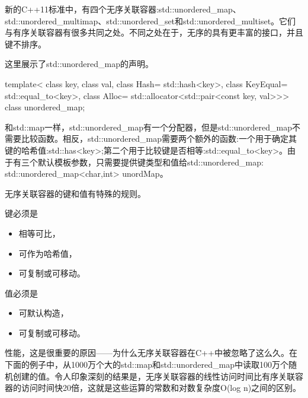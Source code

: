 





新的C++11标准中，有四个无序关联容器:std::unordered\_map、std::unordered\_multimap、std::unordered\_set和std::unordered\_multiset。它们与有序关联容器有很多共同之处。不同之处在于，无序的具有更丰富的接口，并且键不排序。

这里展示了std::unordered\_map的声明。

\begin{cpp}
template< class key, class val, class Hash= std::hash<key>,
	      class KeyEqual= std::equal_to<key>,
          class Alloc= std::allocator<std::pair<const key, val>>>
class unordered_map;
\end{cpp}

和std::map一样，std::unordered\_map有一个分配器，但是std::unordered\_map不需要比较函数。相反，std::unordered\_map需要两个额外的函数:一个用于确定其键的哈希值:std::has<key>;第二个用于比较键是否相等:std::equal\_to<key>。由于有三个默认模板参数，只需要提供键类型和值给std::unordered\_map: std::unordered\_map<char,int> unordMap。


无序关联容器的键和值有特殊的规则。

键必须是

\begin{itemize}
\item
相等可比，

\item
可作为哈希值，

\item
可复制或可移动。
\end{itemize}

值必须是

\begin{itemize}
\item
可默认构造，

\item
可复制或可移动。
\end{itemize}


性能，这是很重要的原因——为什么无序关联容器在C++中被忽略了这么久。在下面的例子中，从1000万个大的std::map和std::unordered\_map中读取100万个随机创建的值。令人印象深刻的结果是，无序关联容器的线性访问时间比有序关联容器的访问时间快20倍，这就是这些运算的常数和对数复杂度O(log n)之间的区别。


